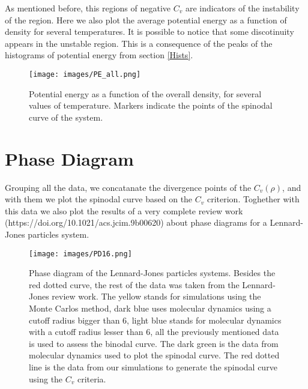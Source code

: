 \documentclass[12pt,letterpaper]{article}
\begin{document}
    As mentioned before, this regions of negative $C_{v}$ are indicators of the instability of the region. 
	Here we also plot the average potential energy as a function of density for several temperatures. It is possible to notice that some discotinuity appears in the unstable region. This is a consequence of the peaks of the histograms of potential energy from section \ref{Hists}.
    
    \begin{figure}[H]
        \centering
        \texttt{[image: images/PE\_all.png]}
        \caption{Potential energy as a function of the overall density, for several values of temperature. Markers indicate the points of the spinodal curve of the system.}
        \label{PE_all}
    \end{figure}
\newpage    
\section{Phase Diagram}  
 Grouping all the data, we concatanate the divergence points of the $C_{v}\left(\rho \right)$, and with them we plot the spinodal curve based on the $C_{v}$ criterion. Toghether with this data we also plot the results of a very complete review work (https://doi.org/10.1021/acs.jcim.9b00620) about phase diagrams for a Lennard-Jones particles system.
 
 \begin{figure}[H]
        \centering
        \texttt{[image: images/PD16.png]}
        \caption{Phase diagram of the Lennard-Jones particles systems. Besides the red dotted curve, the rest of the data was taken from the Lennard-Jones review work. The yellow stands for simulations using the Monte Carlos method, dark blue uses molecular dynamics using a cutoff radius bigger than 6, light blue stands for molecular dynamics with a cutoff radius lesser than 6, all the previously mentioned data is used to assess the binodal curve. The dark green is the data from molecular dynamics used to plot the spinodal curve. The red dotted line is the data from our simulations to generate the spinodal curve using the $C_{v}$ criteria.}
        \label{PD}
    \end{figure}
    
        
\end{document}
